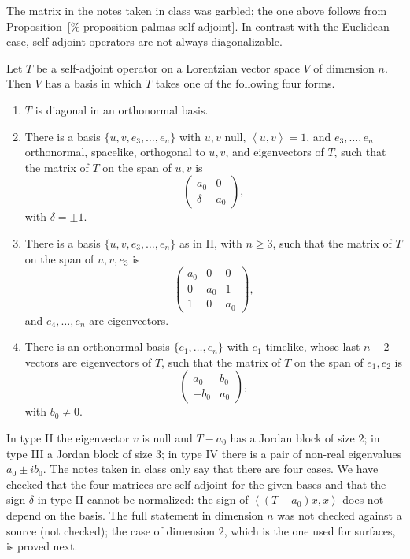 The matrix in the notes taken in class was
garbled; the one above follows from
Proposition~\ref{%
proposition-palmas-self-adjoint}.
In contrast with the Euclidean case,
self-adjoint operators are not always
diagonalizable.

\begin{theorem}
\label{theorem-palmas-canonical-forms}
Let $T$ be a self-adjoint operator on a
Lorentzian vector space $V$ of dimension
$n$. Then $V$ has a basis in which $T$
takes one of the following four forms.
\begin{enumerate}
\item[I.] $T$ is diagonal in an
orthonormal basis.
\item[II.] There is a basis
$\{u,v,e_3,\dots,e_n\}$ with $u,v$ null,
$\left\langle{} u,v \right\rangle{}=1$,
and $e_3,\dots,e_n$ orthonormal, spacelike,
orthogonal to $u,v$, and eigenvectors of
$T$, such that the matrix of $T$ on the
span of $u,v$ is
$$
\begin{pmatrix}
a_0 & 0\\
\delta & a_0
\end{pmatrix},
$$
with $\delta=\pm 1$.
\item[III.] There is a basis
$\{u,v,e_3,\dots,e_n\}$ as in II, with
$n\geq 3$, such that the matrix of $T$ on
the span of $u,v,e_3$ is
$$
\begin{pmatrix}
a_0 & 0 & 0\\
0 & a_0 & 1\\
1 & 0 & a_0
\end{pmatrix},
$$
and $e_4,\dots,e_n$ are eigenvectors.
\item[IV.] There is an orthonormal basis
$\{e_1,\dots,e_n\}$ with $e_1$ timelike,
whose last $n-2$ vectors are
eigenvectors of $T$, such that the matrix
of $T$ on the span of $e_1,e_2$ is
$$
\begin{pmatrix}
a_0 & b_0\\
-b_0 & a_0
\end{pmatrix},
$$
with $b_0\neq 0$.
\end{enumerate}
\end{theorem}

In type II the eigenvector $v$ is null and
$T-a_0$ has a Jordan block of size $2$; in
type III a Jordan block of size $3$; in
type IV there is a pair of non-real
eigenvalues $a_0\pm ib_0$. The notes taken
in class only say that there are four
cases. We have checked that the four
matrices are self-adjoint for the given
bases and that the sign $\delta$ in type II
cannot be normalized: the sign of
$\left\langle{} (T-a_0)x,x \right\rangle{}$
does not depend on the basis. The full
statement in dimension $n$ was not checked
against a source (not checked); the case
of dimension $2$, which is the one used for
surfaces, is proved next.

